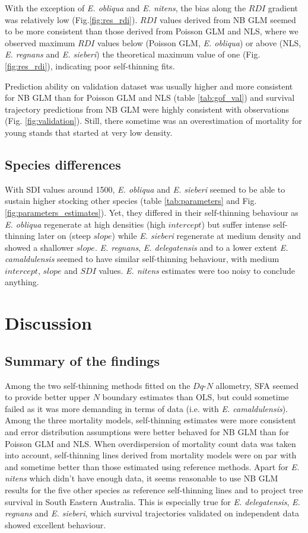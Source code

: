 \documentclass[12pt,english]{article}
\begin{document}
With the exception of \textit{E. obliqua} and \textit{E. nitens}, the bias along the $RDI$ gradient was relatively low (Fig.\ref{fig:res_rdi}). $RDI$ values derived from NB GLM seemed to be more consistent than those derived from Poisson GLM and NLS, where we observed maximum $RDI$ values below (Poisson GLM, \textit{E. obliqua}) or above (NLS, \textit{E. regnans} and \textit{E. sieberi}) the theoretical maximum value of one (Fig.\ref{fig:res_rdi}), indicating poor self-thinning fits.

Prediction ability on validation dataset was usually higher and more consistent for NB GLM than for Poisson GLM and NLS (table \ref{tab:gof_val}) and survival trajectory predictions from NB GLM were highly consistent with observations (Fig. \ref{fig:validation}). Still, there sometime was an overestimation of mortality for young stands that started at very low density.
		
\subsection{Species differences}
With SDI values around 1500, \textit{E. obliqua} and \textit{E. sieberi} seemed to be able to sustain higher stocking other species (table \ref{tab:parameters} and Fig.\ref{fig:parameters_estimates}). Yet, they differed in their self-thinning behaviour as \textit{E. obliqua} regenerate at high densities (high $intercept$) but suffer intense self-thinning later on (steep $slope$) while \textit{E. sieberi} regenerate at medium density and showed a shallower $slope$. \textit{E. regnans}, \textit{E. delegatensis} and to a lower extent \textit{E. camaldulensis} seemed to have similar self-thinning behaviour, with medium $intercept$, $slope$ and $SDI$ values. \textit{E. nitens} estimates were too noisy to conclude anything.
	
\newpage
\section{Discussion}
\subsection{Summary of the findings}
Among the two self-thinning methods fitted on the $Dq$-$N$ allometry, SFA seemed to provide better upper $N$ boundary estimates than OLS, but could sometime failed as it was more demanding in terms of data (i.e. with \textit{E. camaldulensis}). Among the three mortality models, self-thinning estimates were more consistent and error distribution assumptions were better behaved for NB GLM than for Poisson GLM and NLS. When overdispersion of mortality count data was taken into account, self-thinning lines derived from mortality models were on par with and sometime better than those estimated using reference methods. Apart for \textit{E. nitens} which didn't have enough data, it seems reasonable to use NB GLM results for the five other species as reference self-thinning lines and to project tree survival in South Eastern Australia. This is especially true for \textit{E. delegatensis}, \textit{E. regnans} and \textit{E. sieberi}, which survival trajectories validated on independent data showed excellent behaviour.
\end{document}
